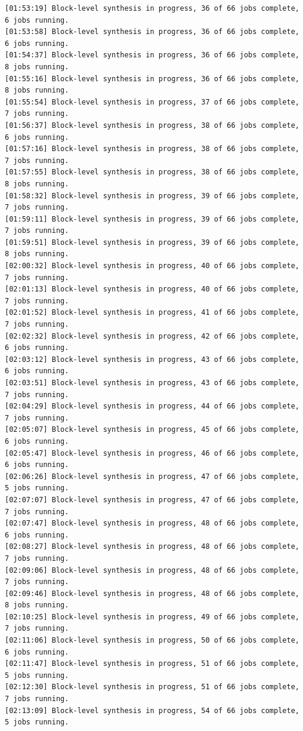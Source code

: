 \begin{lstlisting}[label=code, basicstyle=\tiny, caption=Листинг файла v++\_vinc.log]
[01:53:19] Block-level synthesis in progress, 36 of 66 jobs complete, 6 jobs running.
[01:53:58] Block-level synthesis in progress, 36 of 66 jobs complete, 6 jobs running.
[01:54:37] Block-level synthesis in progress, 36 of 66 jobs complete, 8 jobs running.
[01:55:16] Block-level synthesis in progress, 36 of 66 jobs complete, 8 jobs running.
[01:55:54] Block-level synthesis in progress, 37 of 66 jobs complete, 7 jobs running.
[01:56:37] Block-level synthesis in progress, 38 of 66 jobs complete, 6 jobs running.
[01:57:16] Block-level synthesis in progress, 38 of 66 jobs complete, 7 jobs running.
[01:57:55] Block-level synthesis in progress, 38 of 66 jobs complete, 8 jobs running.
[01:58:32] Block-level synthesis in progress, 39 of 66 jobs complete, 7 jobs running.
[01:59:11] Block-level synthesis in progress, 39 of 66 jobs complete, 7 jobs running.
[01:59:51] Block-level synthesis in progress, 39 of 66 jobs complete, 8 jobs running.
[02:00:32] Block-level synthesis in progress, 40 of 66 jobs complete, 7 jobs running.
[02:01:13] Block-level synthesis in progress, 40 of 66 jobs complete, 7 jobs running.
[02:01:52] Block-level synthesis in progress, 41 of 66 jobs complete, 7 jobs running.
[02:02:32] Block-level synthesis in progress, 42 of 66 jobs complete, 6 jobs running.
[02:03:12] Block-level synthesis in progress, 43 of 66 jobs complete, 6 jobs running.
[02:03:51] Block-level synthesis in progress, 43 of 66 jobs complete, 7 jobs running.
[02:04:29] Block-level synthesis in progress, 44 of 66 jobs complete, 7 jobs running.
[02:05:07] Block-level synthesis in progress, 45 of 66 jobs complete, 6 jobs running.
[02:05:47] Block-level synthesis in progress, 46 of 66 jobs complete, 6 jobs running.
[02:06:26] Block-level synthesis in progress, 47 of 66 jobs complete, 5 jobs running.
[02:07:07] Block-level synthesis in progress, 47 of 66 jobs complete, 7 jobs running.
[02:07:47] Block-level synthesis in progress, 48 of 66 jobs complete, 6 jobs running.
[02:08:27] Block-level synthesis in progress, 48 of 66 jobs complete, 7 jobs running.
[02:09:06] Block-level synthesis in progress, 48 of 66 jobs complete, 7 jobs running.
[02:09:46] Block-level synthesis in progress, 48 of 66 jobs complete, 8 jobs running.
[02:10:25] Block-level synthesis in progress, 49 of 66 jobs complete, 7 jobs running.
[02:11:06] Block-level synthesis in progress, 50 of 66 jobs complete, 6 jobs running.
[02:11:47] Block-level synthesis in progress, 51 of 66 jobs complete, 5 jobs running.
[02:12:30] Block-level synthesis in progress, 51 of 66 jobs complete, 7 jobs running.
[02:13:09] Block-level synthesis in progress, 54 of 66 jobs complete, 5 jobs running.

\end{lstlisting}
